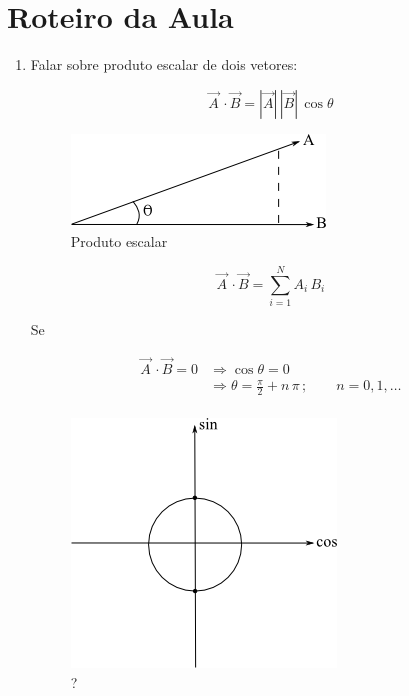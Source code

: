 \section{Roteiro da Aula}

\begin{enumerate}

\item
Falar sobre produto escalar de dois vetores:

\[
 \vec A \, \cdot \vec B = |\vec A| \, |\vec B| \, \cos \theta
\]

\begin{figure}[htb]
    \centering
    \includegraphics[scale=0.8]{capitulos/capitulo2/figuras/roteiro_da_aula1.png}
    \caption{Produto escalar}
    \label{fig:roteiro_da_aula1}
\end{figure}

\[
 \vec A \, \cdot \vec B = \sum_{i=1}^N A_i \, B_i
\]

Se

\[
   \begin{array}{ll}
     \vec A \, \cdot \vec B = 0 & \Rightarrow \cos \theta = 0 \\
                                & \Rightarrow \theta = \displaystyle \frac{\pi}{2} + n\,\pi\,; \qquad n = 0, 1, \ldots \\
   \end{array}
\]

\begin{figure}[htb]
 \centering
 \includegraphics[scale=0.8]{capitulos/capitulo2/figuras/roteiro_da_aula2.png}
 \caption{?}
 \label{fig:roteiro_da_aula2}
\end{figure}


\end{enumerate}
